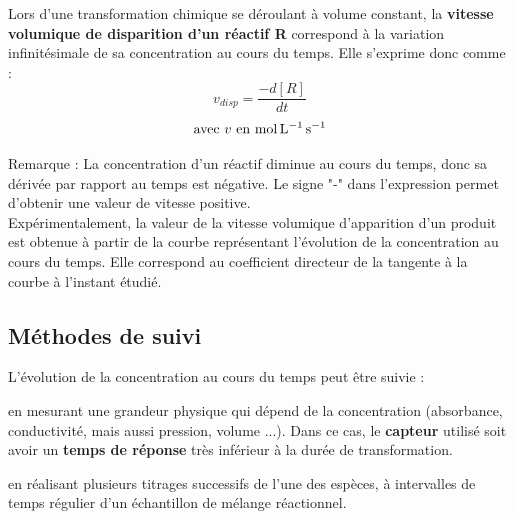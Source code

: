 \documentclass[a4paper,13pt,fleqn]{scrartcl}%
\begin{document}
    \begin{minipage}{.45\linewidth}
    \end{minipage}
    \begin{minipage}{.5\linewidth}
    Lors d'une transformation chimique se déroulant à volume constant, la \textbf{vitesse volumique de disparition d'un réactif R} correspond à la variation infinitésimale de sa concentration au cours du temps. Elle s'exprime donc comme :
    $$v_{disp}=\dfrac{-d[R]}{dt}$$
    $$\text{avec $v$ en \unit{\mole\per\liter\per\second}}$$
    \end{minipage}

    Remarque : La concentration d'un réactif diminue au cours du temps, donc sa dérivée par rapport au temps est négative. Le signe "-" dans l'expression permet d'obtenir une valeur de vitesse positive.\\
    Expérimentalement, la valeur de la vitesse volumique d'apparition d'un produit est obtenue à partir de la courbe représentant l'évolution de la concentration au cours du temps. Elle correspond au coefficient directeur de la tangente à la courbe à l'instant étudié.
    
    \subsection{Méthodes de suivi}
    L'évolution de la concentration au cours du temps peut être suivie :
    \begin{itemize*}
        \item en mesurant une grandeur physique qui dépend de la concentration (absorbance, conductivité, mais aussi pression, volume ...). Dans ce cas, le \textbf{capteur} utilisé soit avoir un \textbf{temps de réponse} très inférieur à la durée de transformation.
        \item en réalisant plusieurs titrages successifs de l'une des espèces, à intervalles de temps régulier d'un échantillon de mélange réactionnel.
    \end{itemize*}
    
\end{document}
